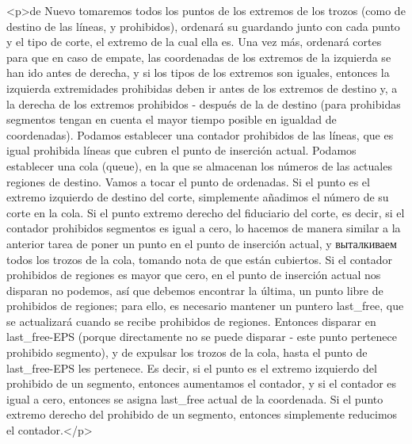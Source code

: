 <p>de Nuevo tomaremos todos los puntos de los extremos de los trozos (como de destino de las líneas, y prohibidos), ordenará su guardando junto con cada punto y el tipo de corte, el extremo de la cual ella es. Una vez más, ordenará cortes para que en caso de empate, las coordenadas de los extremos de la izquierda se han ido antes de derecha, y si los tipos de los extremos son iguales, entonces la izquierda extremidades prohibidas deben ir antes de los extremos de destino y, a la derecha de los extremos prohibidos - después de la de destino (para prohibidas segmentos tengan en cuenta el mayor tiempo posible en igualdad de coordenadas). Podamos establecer una contador prohibidos de las líneas, que es igual prohibida líneas que cubren el punto de inserción actual. Podamos establecer una cola (queue), en la que se almacenan los números de las actuales regiones de destino. Vamos a tocar el punto de ordenadas. Si el punto es el extremo izquierdo de destino del corte, simplemente añadimos el número de su corte en la cola. Si el punto extremo derecho del fiduciario del corte, es decir, si el contador prohibidos segmentos es igual a cero, lo hacemos de manera similar a la anterior tarea de poner un punto en el punto de inserción actual, y выталкиваем todos los trozos de la cola, tomando nota de que están cubiertos. Si el contador prohibidos de regiones es mayor que cero, en el punto de inserción actual nos disparan no podemos, así que debemos encontrar la última, un punto libre de prohibidos de regiones; para ello, es necesario mantener un puntero last_free, que se actualizará cuando se recibe prohibidos de regiones. Entonces disparar en last_free-EPS (porque directamente no se puede disparar - este punto pertenece prohibido segmento), y de expulsar los trozos de la cola, hasta el punto de last_free-EPS les pertenece. Es decir, si el punto es el extremo izquierdo del prohibido de un segmento, entonces aumentamos el contador, y si el contador es igual a cero, entonces se asigna last_free actual de la coordenada. Si el punto extremo derecho del prohibido de un segmento, entonces simplemente reducimos el contador.</p>